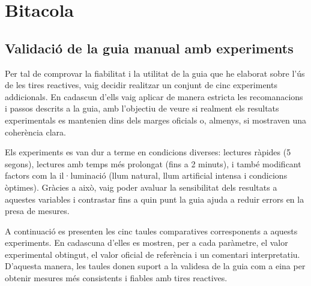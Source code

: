 \chapter{Bitacola}


\section{Validació de la guia manual amb experiments} \label{s:A1}

Per tal de comprovar la fiabilitat i la utilitat de la guia que he elaborat sobre l’ús de les tires reactives, vaig decidir realitzar un conjunt de cinc experiments addicionals. En cadascun d’ells vaig aplicar de manera estricta les recomanacions i passos descrits a la guia, amb l’objectiu de veure si realment els resultats experimentals es mantenien dins dels marges oficials o, almenys, si mostraven una coherència clara.

Els experiments es van dur a terme en condicions diverses: lectures ràpides (5 segons), lectures amb temps més prolongat (fins a 2 minuts), i també modificant factors com la il·luminació (llum natural, llum artificial intensa i condicions òptimes). Gràcies a això, vaig poder avaluar la sensibilitat dels resultats a aquestes variables i contrastar fins a quin punt la guia ajuda a reduir errors en la presa de mesures.

A continuació es presenten les cinc taules comparatives corresponents a aquests experiments. En cadascuna d’elles es mostren, per a cada paràmetre, el valor experimental obtingut, el valor oficial de referència i un comentari interpretatiu. D’aquesta manera, les taules donen suport a la validesa de la guia com a eina per obtenir mesures més consistents i fiables amb tires reactives.


